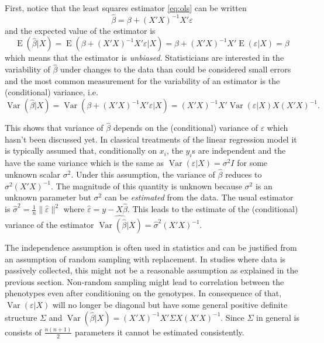 \documentclass[final,leqno]{siamltex1213}
\DeclareMathOperator{\E}{E}
\DeclareMathOperator{\Var}{Var}
\begin{document}
First, notice that the least squares estimator \eqref{eq:ols} can be written
\begin{equation*}
    \hat{\beta} = \beta + (X'X)^{-1}X'\varepsilon
\end{equation*}
and the expected value of the estimator is
\begin{equation}
    \E(\hat{\beta}|X) = \E(\beta + (X'X)^{-1}X'\varepsilon|X) =
        \beta + (X'X)^{-1}X'\E(\varepsilon|X) = \beta
\end{equation}
which means that the estimator is \emph{unbiased}. Statisticians are interested in the variability of $\hat{\beta}$ under changes to the data than could be considered small errors and the most common measurement for the variability of an estimator is the (conditional) variance, i.e.
\begin{equation*}
    \Var(\hat{\beta}|X) = \Var(\beta + (X'X)^{-1}X'\varepsilon|X) =
        (X'X)^{-1}X'\Var(\varepsilon|X)X(X'X)^{-1}.
\end{equation*}

This shows that variance of $\hat{\beta}$ depends on the (conditional) variance of $\varepsilon$ which hasn't been discussed yet. In classical treatments of the linear regression model it is typically assumed that, conditionally on $x_i$, the $y_i$s are independent and the have the same variance which is the same as $\Var(\varepsilon|X)=\sigma^2 I$ for some unknown scalar $\sigma^2$. Under this assumption, the variance of $\hat{\beta}$ reduces to $\sigma^2 (X'X)^{-1}$. The magnitude of this quantity is unknown because $\sigma^2$ is an unknown parameter but $\sigma^2$ can be \emph{estimated} from the data. The usual estimator is $\hat{\sigma}^2=\frac{1}{n} \|\hat{\varepsilon}\|^2$ where $\hat{\varepsilon} = y - X\hat{\beta}$. This leads to the estimate of the (conditional) variance of the estimator $\widehat{\Var(\hat{\beta}|X)} = \hat{\sigma}^2(X'X)^{-1}$.

The independence assumption is often used in statistics and can be justified from an assumption of random sampling with replacement. In studies where data is passively collected, this might not be a reasonable assumption as explained in the previous section. Non-random sampling might lead to correlation between the phenotypes even after conditioning on the genotypes. In consequence of that, $\Var(\varepsilon|X)$ will no longer be diagonal but have some general positive definite structure $\Sigma$ and $\Var(\hat{\beta}|X)=(X'X)^{-1}X'\Sigma X(X'X)^{-1}$. Since $\Sigma$ in general is consists of $\frac{n(n+1)}{2}$ parameters it cannot be estimated consistently.
\end{document}
